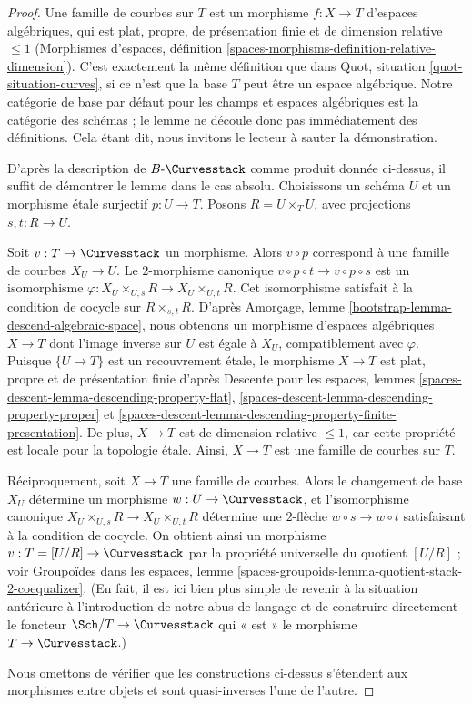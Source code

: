 \begin{proof}
Une famille de courbes sur $T$ est un morphisme $f : X \to T$ d'espaces
algébriques, qui est plat, propre, de présentation finie et de
dimension relative $\leq 1$ (Morphismes d'espaces, définition
\ref{spaces-morphisms-definition-relative-dimension}).
C'est exactement la même définition que dans Quot, situation
\ref{quot-situation-curves}, si ce n'est que la base $T$ peut être
un espace algébrique. Notre catégorie de base par défaut pour les
champs et espaces algébriques est la catégorie des schémas ; le lemme
ne découle donc pas immédiatement des définitions. Cela étant dit,
nous invitons le lecteur à sauter la démonstration.

\medskip\noindent
D'après la description de $B\text{-}\Curvesstack$ comme produit donnée
ci-dessus, il suffit de démontrer le lemme dans le cas absolu. Choisissons
un schéma $U$ et un morphisme étale surjectif $p : U \to T$.
Posons $R = U \times_T U$, avec projections $s, t : R \to U$.

\medskip\noindent
Soit $v : T \to \Curvesstack$ un morphisme. Alors $v \circ p$
correspond à une famille de courbes $X_U \to U$. Le
$2$-morphisme canonique $v \circ p \circ t \to v \circ p \circ s$
est un isomorphisme $\varphi : X_U \times_{U, s} R \to X_U \times_{U, t} R$.
Cet isomorphisme satisfait à la condition de cocycle sur
$R \times_{s, t} R$.
D'après Amorçage, lemme \ref{bootstrap-lemma-descend-algebraic-space},
nous obtenons un morphisme d'espaces algébriques $X \to T$
dont l'image inverse sur $U$ est égale à $X_U$, compatiblement avec $\varphi$.
Puisque $\{U \to T\}$ est un recouvrement étale, le morphisme
$X \to T$ est plat, propre et de présentation finie d'après
Descente pour les espaces, lemmes
\ref{spaces-descent-lemma-descending-property-flat},
\ref{spaces-descent-lemma-descending-property-proper} et
\ref{spaces-descent-lemma-descending-property-finite-presentation}.
De plus, $X \to T$ est de dimension relative $\leq 1$, car cette propriété
est locale pour la topologie étale. Ainsi, $X \to T$ est une famille de
courbes sur $T$.

\medskip\noindent
Réciproquement, soit $X \to T$ une famille de courbes. Alors le
changement de base $X_U$ détermine un morphisme $w : U \to \Curvesstack$,
et l'isomorphisme canonique $X_U \times_{U, s} R \to X_U \times_{U, t} R$
détermine une $2$-flèche $w \circ s \to w \circ t$ satisfaisant à la
condition de cocycle. On obtient ainsi un morphisme
$v : T = [U/R] \to \Curvesstack$ par la propriété universelle du
quotient $[U/R]$ ; voir
Groupoïdes dans les espaces, lemme
\ref{spaces-groupoids-lemma-quotient-stack-2-coequalizer}.
(En fait, il est ici bien plus simple de revenir à la situation antérieure
à l'introduction de notre abus de langage et de construire directement
le foncteur $\Sch/T \to \Curvesstack$ qui « est » le
morphisme $T \to \Curvesstack$.)

\medskip\noindent
Nous omettons de vérifier que les constructions ci-dessus
s'étendent aux morphismes entre objets et sont quasi-inverses l'une de l'autre.
\end{proof}






